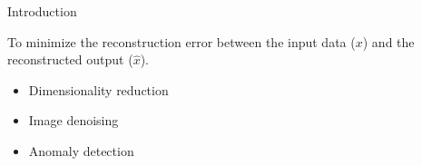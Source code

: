 \documentclass{beamer}
\begin{document}
\begin{frame}{Introduction}
    \begin{tcolorbox}[colback=red!5!white, colframe=red!75!black, title=Objective]
        To minimize the reconstruction error between the input data (\(x\)) and the reconstructed output (\(\hat{x}\)).
    \end{tcolorbox}

    \vspace{0.3cm}

    \begin{tcolorbox}[colback=yellow!5!white, colframe=yellow!75!black, title=Applications]
        \begin{itemize}
            \item Dimensionality reduction
            \item Image denoising
            \item Anomaly detection
        \end{itemize}
    \end{tcolorbox}
    
\end{frame}
\end{document}
